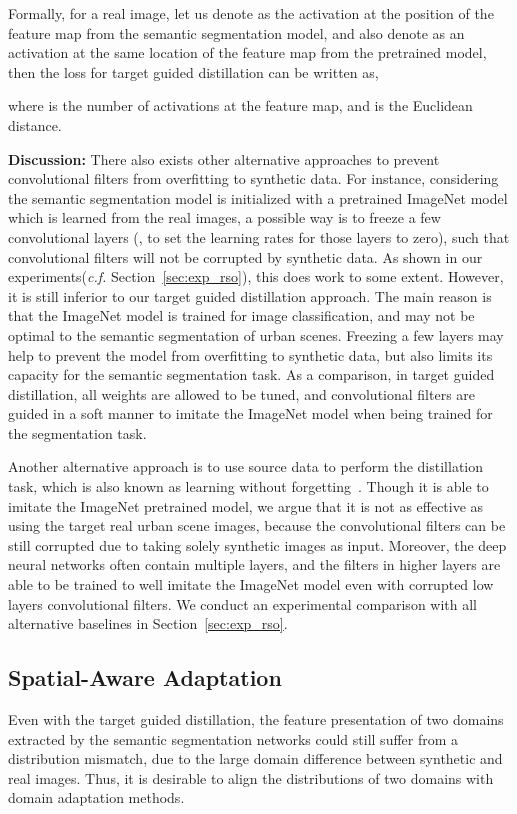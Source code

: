 \documentclass[10pt,twocolumn,letterpaper]{article}
\begin{document}
Formally, for a real image, let us denote  as the activation at the position  of the feature map from the semantic segmentation model, and also denote  as an activation at the same location of the feature map from the pretrained model, then the loss for target guided distillation can be written as,

where  is the number of activations at the feature map, and  is the Euclidean distance. 

\textbf{Discussion:} There also exists other alternative approaches to prevent convolutional filters from overfitting to synthetic data. For instance, considering the semantic segmentation model is initialized with a pretrained ImageNet model which is learned from the real images, a possible way is to freeze a few convolutional layers (\ie, to set the learning rates for those layers to zero), such that convolutional filters will not be corrupted by synthetic data. As shown in our experiments(\textit{c.f.} Section~\ref{sec:exp_rso}), this does work to some extent. However, it is still inferior to our target guided distillation approach. The main reason is that the ImageNet model is trained for image classification, and may not be optimal to the semantic segmentation of urban scenes. Freezing a few layers may help to prevent the model from overfitting to synthetic data, but also limits its capacity for the semantic segmentation task. As a comparison, in target guided distillation, all weights are allowed to be tuned, and convolutional filters are guided in a soft manner to imitate the ImageNet model when being trained for the segmentation task. 

Another alternative approach is to use source data to perform the distillation task, which is also known as learning without forgetting~\cite{li2016learning}. Though it is able to imitate the ImageNet pretrained model, we argue that it is not as effective as  using the target real urban scene images, because the convolutional filters can be still corrupted due to taking solely synthetic images as input. Moreover, the deep neural networks often contain multiple layers, and the filters in higher layers are able to be trained to well imitate the ImageNet model even with corrupted low layers convolutional filters. We conduct an experimental comparison with all alternative baselines in Section~\ref{sec:exp_rso}. 

\subsection{Spatial-Aware Adaptation}
Even with the target guided distillation, the feature presentation of two domains extracted by the semantic segmentation networks could still suffer from a distribution mismatch, due to the large domain difference between synthetic and real images. Thus, it is desirable to align the distributions of two domains with domain adaptation methods. 
\end{document}
